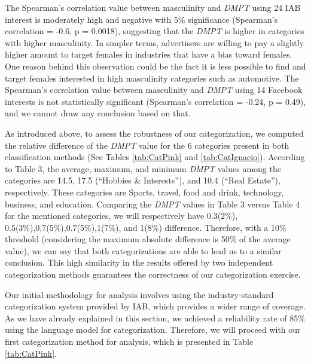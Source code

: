 \documentclass[twocolumn]{bmcart}\usepackage{lineno}
\begin{document}
\color{blue}The Spearman's correlation value between masculinity and \emph{DMPT} using 24 IAB interest is moderately high and negative with 5\% significance (Spearman’s correlation = -0.6, p = 0.0018), suggesting that the \emph{DMPT} is higher in categories with higher masculinity. In simpler terms, advertisers are willing to pay a slightly higher amount to target females in industries that have a bias toward females. One reason behind this observation could be the fact it is less possible to find and target females interested in high masculinity categories such as automotive. The Spearman's correlation value between masculinity and \emph{DMPT} using 14 Facebook interests is not statistically significant (Spearman’s correlation = -0.24, p = 0.49), and we cannot draw any conclusion based on that. 
\color{black}
% 

As introduced above, to assess the robustness of our categorization, we computed the relative difference of the \emph{DMPT} value for the 6 categories present in both classification methods (See Tables \ref{tab:CatPink} and \ref{tab:CatIgnacio}). \color{blue} According to Table 3, the average, maximum, and minimum \emph{DMPT} values among the categories are 14.5, 17.5 (“Hobbies \& Interests”), and 10.4 (“Real Estate”), respectively. These categories are Sports, travel, food and drink, technology, business, and education. Comparing the \emph{DMPT} values in Table 3 versus Table 4 for the mentioned categories, we will respectively have 0.3(2\%), 0.5(3\%),0.7(5\%),0.7(5\%),1(7\%), and 1(8\%) difference. Therefore, with a 10\% threshold (considering the maximum absolute difference is 50\% of the average value), we can say that both categorizations are able to lead us to a similar conclusion. This high similarity in the results offered by two independent categorization methods guarantees the correctness of our categorization exercise. \color{black}

\color{blue} Our initial methodology for analysis involves using the industry-standard categorization system provided by IAB, which provides a wider range of coverage. As we have already explained in this section, we achieved a reliability rate of 85\% using the language model for categorization. Therefore, we will proceed with our first categorization method for analysis, which is presented in Table \ref{tab:CatPink}. 
\end{document}

